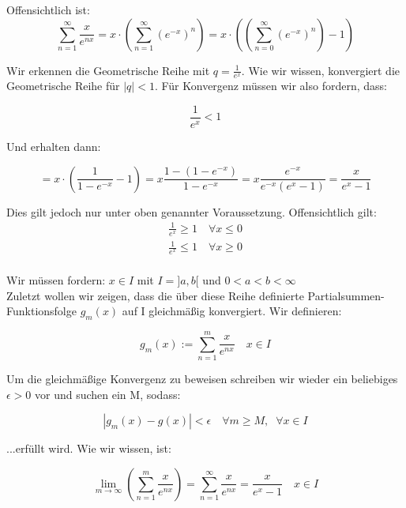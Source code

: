 \documentclass[a4paper,german,12pt,smallheadings]{scrartcl}
\begin{document}
Offensichtlich ist:
\begin{equation*}
    \sum_{n=1}^\infty \frac{x}{e^{nx}} = x \cdot \left(\sum_{n=1}^\infty \left(e^{-x}\right)^n\right) = x \cdot \left(\left(\sum_{n=0}^\infty \left(e^{-x}\right)^n\right) - 1\right)
\end{equation*}

Wir erkennen die Geometrische Reihe mit $q=\frac{1}{e^x}$. Wie wir wissen, konvergiert die Geometrische Reihe für $|q|<1$. Für Konvergenz müssen wir also fordern, dass:

\begin{equation*}
\frac{1}{e^x}<1
\end{equation*}

Und erhalten dann:

\begin{equation*}
    = x \cdot \left( \frac{1}{1-e^{-x}} - 1 \right) = x \frac{1 - (1-e^{-x})}{1-e^{-x}} = x \frac{e^{-x}}{e^{-x} (e^x - 1)} = \frac{x}{e^x-1}
\end{equation*}

Dies gilt jedoch nur unter oben genannter Voraussetzung. Offensichtlich gilt:
\begin{align*}
\frac{1}{e^x}\geq 1 \quad \forall x\leq 0\\
\frac{1}{e^x}\le 1 \quad \forall x\ge 0\\
\end{align*}

Wir müssen fordern: $x\in I$ mit $I=]a,b[$ und $0<a<b<\infty$\\
Zuletzt wollen wir zeigen, dass die über diese Reihe definierte Partialsummen-Funktionsfolge $g_m(x)$ auf I gleichmäßig konvergiert. Wir definieren:

\begin{equation*}
g_m(x):=\sum_{n=1}^{m}\frac{x}{e^{nx}} \quad x\in I
\end{equation*}

Um die gleichmäßige Konvergenz zu beweisen schreiben wir wieder ein beliebiges $\epsilon>0$ vor und suchen ein M, sodass:

\begin{equation}
|g_m(x)-g(x)|<\epsilon \quad \forall m\geq M, \;\; \forall x\in I
\end{equation}

...erfüllt wird. Wie wir wissen, ist:

\begin{equation*}
\lim\limits_{m \to \infty}\left(\sum_{n=1}^{m}\frac{x}{e^{nx}}\right)=\sum_{n=1}^{\infty}\frac{x}{e^{nx}}=\frac{x}{e^x-1} \quad x\in I
\end{equation*}
\end{document}
